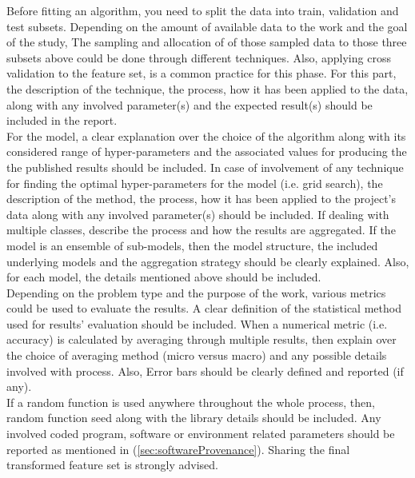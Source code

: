     
    Before fitting an algorithm, you need to split the data into train, validation and test subsets. Depending on the amount of 
    available data to the work and the goal of the study, The sampling and allocation of of those sampled data to 
    those three subsets above could be done through different techniques. Also, applying cross validation to the feature set, is a common 
    practice for this phase. For this part, the description of the technique, the process, how it has been applied to the data, along with 
    any involved parameter(s) and the expected result(s) should be included in the report.\\
    
    
    For the model, a clear explanation over the choice of the algorithm along with its considered range of hyper-parameters and 
    the associated values for producing the 
    the published results should be included. In case of involvement of any technique for finding the optimal hyper-parameters for the model
    (i.e. grid search), the description of the method, the process, how it has been applied to the project's data along with any involved 
    parameter(s) should be included. 
    If dealing with multiple classes, describe the process and how the results are aggregated.
    If the model is an ensemble of sub-models, then the model structure, the included underlying models and the aggregation 
    strategy should be clearly explained. Also, for each model, the details mentioned above should be included.\\
    

    Depending on the problem type and the purpose of the work, various metrics could be used to evaluate the results. 
    A clear definition of the statistical method used for results' evaluation should be included. 
    When a numerical metric (i.e. accuracy) is calculated by averaging through multiple results, 
    then explain over the choice of averaging method (micro versus macro) and 
    any possible details involved with process. Also, Error bars should be clearly defined and reported (if any).\\
  
    
    If a random function is used anywhere throughout the whole process, then, random function seed along 
    with the library details should be included. Any involved coded program, software or environment related parameters 
    should be reported as mentioned in (\ref{sec:softwareProvenance}). Sharing the final transformed feature set is strongly advised.
    

